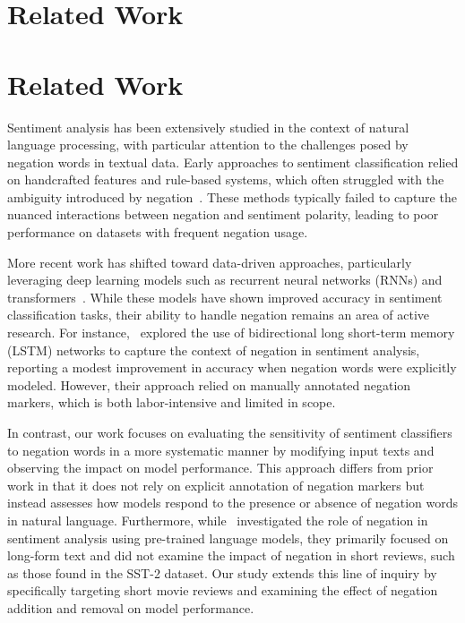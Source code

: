 \documentclass{article}
\begin{document}
\section{Related Work}
\section{Related Work}

Sentiment analysis has been extensively studied in the context of natural language processing, with particular attention to the challenges posed by negation words in textual data. Early approaches to sentiment classification relied on handcrafted features and rule-based systems, which often struggled with the ambiguity introduced by negation~\cite{pang2008opinion}. These methods typically failed to capture the nuanced interactions between negation and sentiment polarity, leading to poor performance on datasets with frequent negation usage.

More recent work has shifted toward data-driven approaches, particularly leveraging deep learning models such as recurrent neural networks (RNNs) and transformers~\cite{tan2019sentiment}. While these models have shown improved accuracy in sentiment classification tasks, their ability to handle negation remains an area of active research. For instance,~\cite{zhang2015deep} explored the use of bidirectional long short-term memory (LSTM) networks to capture the context of negation in sentiment analysis, reporting a modest improvement in accuracy when negation words were explicitly modeled. However, their approach relied on manually annotated negation markers, which is both labor-intensive and limited in scope.

In contrast, our work focuses on evaluating the sensitivity of sentiment classifiers to negation words in a more systematic manner by modifying input texts and observing the impact on model performance. This approach differs from prior work in that it does not rely on explicit annotation of negation markers but instead assesses how models respond to the presence or absence of negation words in natural language. Furthermore, while~\cite{wang2020negation} investigated the role of negation in sentiment analysis using pre-trained language models, they primarily focused on long-form text and did not examine the impact of negation in short reviews, such as those found in the SST-2 dataset. Our study extends this line of inquiry by specifically targeting short movie reviews and examining the effect of negation addition and removal on model performance.
\end{document}
